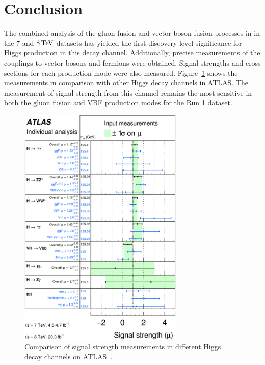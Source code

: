 \section{Conclusion}

The combined analysis of the gluon fusion and vector boson fusion processes in \HWWfull in the $7$ and $8 \TeV$ datasets has yielded the first discovery level significance for Higgs production in this decay channel. Additionally, precise measurements of the couplings to vector bosons and fermions were obtained. Signal strengths and cross sections for each production mode were also measured. Figure~\ref{fig:mu_summary} shows the \HWWfull measurements in comparison with other Higgs decay channels in ATLAS. The measurement of signal strength from this channel remains the most sensitive in both the gluon fusion and VBF production modes for the Run 1 dataset. 

\begin{figure}[h!]
  \centering
  \captionsetup{justification=centering}

  \includegraphics[width=0.7\textwidth]{figures/mu_summary}
  \caption{Comparison of signal strength measurements in different Higgs decay channels on ATLAS~\cite{HiggsSummaryRun1}.}
  \label{fig:mu_summary}
\end{figure}

